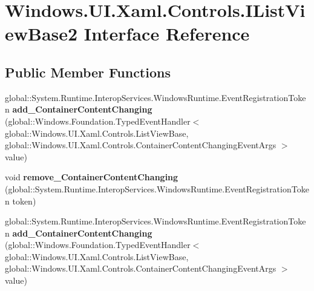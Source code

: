 \hypertarget{interface_windows_1_1_u_i_1_1_xaml_1_1_controls_1_1_i_list_view_base2}{}\section{Windows.\+U\+I.\+Xaml.\+Controls.\+I\+List\+View\+Base2 Interface Reference}
\label{interface_windows_1_1_u_i_1_1_xaml_1_1_controls_1_1_i_list_view_base2}
\subsection*{Public Member Functions}
\begin{DoxyCompactItemize}
\item 
\mbox{\label{interface_windows_1_1_u_i_1_1_xaml_1_1_controls_1_1_i_list_view_base2_a5cab1e13152724edf292ffbea21ea46e}} 
global\+::\+System.\+Runtime.\+Interop\+Services.\+Windows\+Runtime.\+Event\+Registration\+Token {\bfseries add\+\_\+\+Container\+Content\+Changing} (global\+::\+Windows.\+Foundation.\+Typed\+Event\+Handler$<$ global\+::\+Windows.\+U\+I.\+Xaml.\+Controls.\+List\+View\+Base, global\+::\+Windows.\+U\+I.\+Xaml.\+Controls.\+Container\+Content\+Changing\+Event\+Args $>$ value)
\item 
\mbox{\label{interface_windows_1_1_u_i_1_1_xaml_1_1_controls_1_1_i_list_view_base2_adfd6f212de8056b9078bc8b1c9eb39ea}} 
void {\bfseries remove\+\_\+\+Container\+Content\+Changing} (global\+::\+System.\+Runtime.\+Interop\+Services.\+Windows\+Runtime.\+Event\+Registration\+Token token)
\item 
\mbox{\label{interface_windows_1_1_u_i_1_1_xaml_1_1_controls_1_1_i_list_view_base2_a5cab1e13152724edf292ffbea21ea46e}} 
global\+::\+System.\+Runtime.\+Interop\+Services.\+Windows\+Runtime.\+Event\+Registration\+Token {\bfseries add\+\_\+\+Container\+Content\+Changing} (global\+::\+Windows.\+Foundation.\+Typed\+Event\+Handler$<$ global\+::\+Windows.\+U\+I.\+Xaml.\+Controls.\+List\+View\+Base, global\+::\+Windows.\+U\+I.\+Xaml.\+Controls.\+Container\+Content\+Changing\+Event\+Args $>$ value)
\item 

\end{DoxyCompactItemize}
